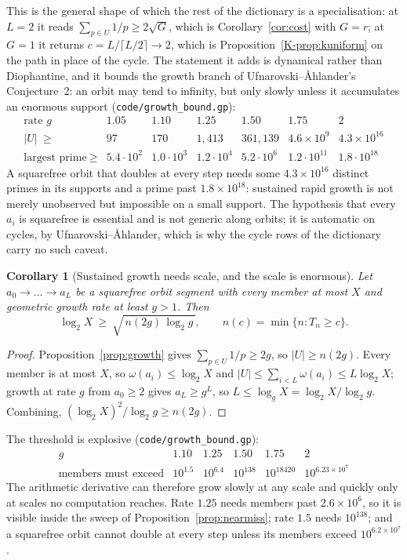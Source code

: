 \documentclass[11pt]{article}
\newtheorem{corollary}[theorem]{Corollary}
\theoremstyle{definition}
\begin{document}
This is the general shape of which the rest of the dictionary is a specialisation: at $L=2$ it reads
$\sum_{p\in U}1/p\ge2\sqrt G$, which is Corollary~\ref{cor:cost} with $G=r$; at $G=1$ it returns
$c=L/\lceil L/2\rceil\to2$, which is Proposition~\ref{K-prop:kuniform} on the path in place of the
cycle. The statement it adds is dynamical rather than Diophantine, and it bounds the growth branch
of Ufnarovski--\AA hlander's Conjecture~2: an orbit may tend to infinity, but only slowly unless it
accumulates an enormous support \textup{(\texttt{code/growth\_bound.gp})}:
\[
\begin{array}{l|cccccc}
\text{rate }g & 1.05 & 1.10 & 1.25 & 1.50 & 1.75 & 2\\\hline
|U|\ \ge & 97 & 170 & 1{,}413 & 361{,}139 & 4.6\times10^{9} & 4.3\times10^{16}\\
\text{largest prime}\ \ge & 5.4\!\cdot\!10^{2} & 1.0\!\cdot\!10^{3} & 1.2\!\cdot\!10^{4} &
 5.2\!\cdot\!10^{6} & 1.2\!\cdot\!10^{11} & 1.8\!\cdot\!10^{18}
\end{array}
\]
A squarefree orbit that doubles at every step needs some $4.3\times10^{16}$ distinct primes in its
supports and a prime past $1.8\times10^{18}$: sustained rapid growth is not merely unobserved but
impossible on a small support. The hypothesis that every $a_i$ is squarefree is essential and is not
generic along orbits; it is automatic on cycles, by Ufnarovski--\AA hlander, which is why the cycle
rows of the dictionary carry no such caveat.

\begin{corollary}[Sustained growth needs scale, and the scale is enormous]\label{cor:growthscale}
Let $a_0\to\dots\to a_L$ be a squarefree orbit segment with every member at most $X$ and geometric
growth rate at least $g>1$. Then
\[ \log_2X\ \ge\ \sqrt{\,n(2g)\,\log_2 g\,},\qquad n(c)=\min\{n:T_n\ge c\}. \]
\end{corollary}
\begin{proof}
Proposition~\ref{prop:growth} gives $\sum_{p\in U}1/p\ge2g$, so $|U|\ge n(2g)$. Every member is at
most $X$, so $\omega(a_i)\le\log_2X$ and $|U|\le\sum_{i<L}\omega(a_i)\le L\log_2X$; growth at rate
$g$ from $a_0\ge2$ gives $a_L\ge g^{L}$, so $L\le\log_gX=\log_2X/\log_2g$. Combining,
$(\log_2X)^2/\log_2g\ge n(2g)$.
\end{proof}

The threshold is explosive \textup{(\texttt{code/growth\_bound.gp})}:
\[
\begin{array}{l|ccccc}
g & 1.10 & 1.25 & 1.50 & 1.75 & 2\\\hline
\text{members must exceed} & 10^{1.5} & 10^{6.4} & 10^{138} & 10^{18420} &
 10^{6.23\times10^{7}}
\end{array}
\]
The arithmetic derivative can therefore grow slowly at any scale and quickly only at scales no
computation reaches. Rate $1.25$ needs members past $2.6\times10^{6}$, so it is visible inside the
sweep of Proposition~\ref{prop:nearmiss}; rate $1.5$ needs $10^{138}$; and a squarefree orbit cannot
double at every step unless its members exceed $10^{6.2\times10^{7}}$.
\end{document}
